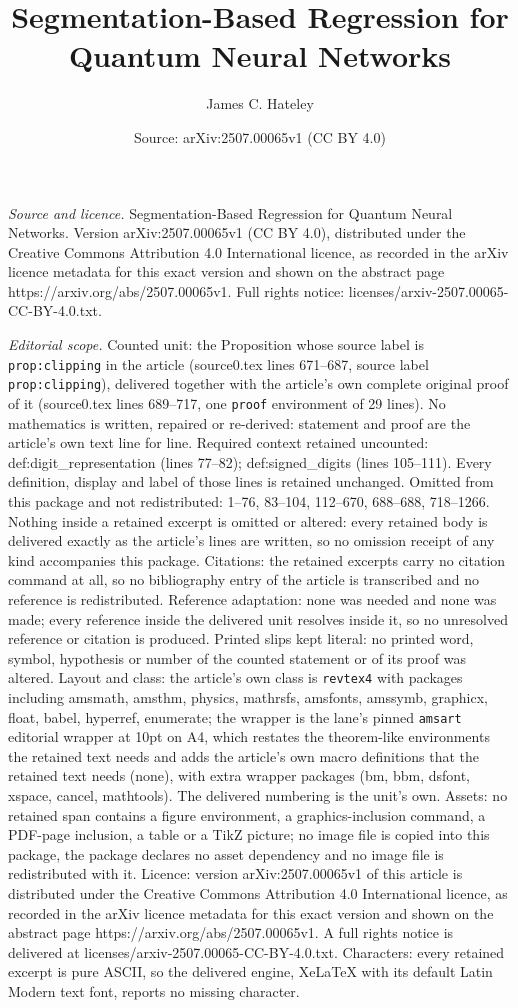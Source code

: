 \documentclass[10pt,a4paper]{amsart}
\title[Segmentation-Based Regression for Quantum Neural Networks]{Segmentation-Based Regression for Quantum Neural Networks}
\author{James C. Hateley}
\date{Source: arXiv:2507.00065v1 (CC BY 4.0)}
\begin{document}
\maketitle

\noindent\emph{Source and licence.} Segmentation-Based Regression for Quantum Neural Networks. Version arXiv:2507.00065v1 (CC BY 4.0), distributed under the Creative Commons Attribution 4.0 International licence, as recorded in the arXiv licence metadata for this exact version and shown on the abstract page https://arxiv.org/abs/2507.00065v1. Full rights notice: licenses/arxiv-2507.00065-CC-BY-4.0.txt.\par\smallskip

\noindent\textit{Editorial scope.} Counted unit: the Proposition whose source label is \texttt{prop:clipping} in the article (source0.tex lines 671--687, source label \texttt{prop:clipping}), delivered together with the article's own complete original proof of it (source0.tex lines 689--717, one \texttt{proof} environment of 29 lines). No mathematics is written, repaired or re-derived: statement and proof are the article's own text line for line. Required context retained uncounted: def:digit\_representation (lines 77--82); def:signed\_digits (lines 105--111). Every definition, display and label of those lines is retained unchanged. Omitted from this package and not redistributed: 1--76, 83--104, 112--670, 688--688, 718--1266. Nothing inside a retained excerpt is omitted or altered: every retained body is delivered exactly as the article's lines are written, so no omission receipt of any kind accompanies this package. Citations: the retained excerpts carry no citation command at all, so no bibliography entry of the article is transcribed and no reference is redistributed. Reference adaptation: none was needed and none was made; every reference inside the delivered unit resolves inside it, so no unresolved reference or citation is produced. Printed slips kept literal: no printed word, symbol, hypothesis or number of the counted statement or of its proof was altered. Layout and class: the article's own class is \texttt{revtex4} with packages including amsmath, amsthm, physics, mathrsfs, amsfonts, amssymb, graphicx, float, babel, hyperref, enumerate; the wrapper is the lane's pinned \texttt{amsart} editorial wrapper at 10pt on A4, which restates the theorem-like environments the retained text needs and adds the article's own macro definitions that the retained text needs (none), with extra wrapper packages (bm, bbm, dsfont, xspace, cancel, mathtools). The delivered numbering is the unit's own. Assets: no retained span contains a figure environment, a graphics-inclusion command, a PDF-page inclusion, a table or a TikZ picture; no image file is copied into this package, the package declares no asset dependency and no image file is redistributed with it. Licence: version arXiv:2507.00065v1 of this article is distributed under the Creative Commons Attribution 4.0 International licence, as recorded in the arXiv licence metadata for this exact version and shown on the abstract page https://arxiv.org/abs/2507.00065v1. A full rights notice is delivered at licenses/arxiv-2507.00065-CC-BY-4.0.txt. Characters: every retained excerpt is pure ASCII, so the delivered engine, XeLaTeX with its default Latin Modern text font, reports no missing character.
\end{document}
